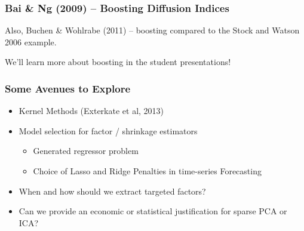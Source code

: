 \documentclass[handout]{beamer}
\begin{document}
\begin{frame}[c]\frametitle{Bai \& Ng (2009) -- Boosting Diffusion Indices}
    
Also, Buchen \& Wohlrabe (2011) -- boosting compared to the Stock and Watson 2006 example.

We'll learn more about boosting in the student presentations!
\end{frame}
\begin{frame}[c]\frametitle{Some Avenues to Explore}
   
\begin{itemize}
	\item Kernel Methods (Exterkate et al, 2013)
	\item Model selection for factor / shrinkage estimators
		\begin{itemize}
			\item Generated regressor problem
			\item Choice of Lasso and Ridge Penalties in time-series Forecasting 
		\end{itemize}
	\item When and how should we extract targeted factors?
	\item Can we provide an economic or statistical justification for sparse PCA or ICA?
\end{itemize}

\end{frame}
\end{document}
